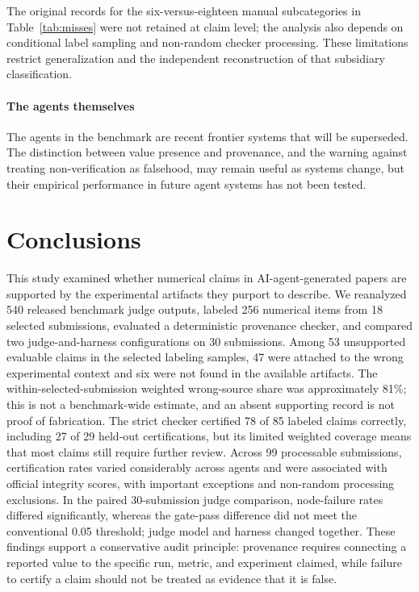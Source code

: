 \documentclass[preprint,12pt,authoryear]{elsarticle}
\begin{document}
The original records for the six-versus-eighteen manual subcategories in Table~\ref{tab:misses} were not retained at claim level; the analysis also depends on conditional label sampling and non-random checker processing. These limitations restrict generalization and the independent reconstruction of that subsidiary classification.

\paragraph{The agents themselves} The agents in the benchmark are recent frontier systems that will be superseded. The distinction between value presence and provenance, and the warning against treating non-verification as falsehood, may remain useful as systems change, but their empirical performance in future agent systems has not been tested.

\section{Conclusions}\label{sec:conclusion}

This study examined whether numerical claims in AI-agent-generated papers are supported by the experimental artifacts they purport to describe. We reanalyzed 540 released benchmark judge outputs, labeled 256 numerical items from 18 selected submissions, evaluated a deterministic provenance checker, and compared two judge-and-harness configurations on 30 submissions. Among 53 unsupported evaluable claims in the selected labeling samples, 47 were attached to the wrong experimental context and six were not found in the available artifacts. The within-selected-submission weighted wrong-source share was approximately 81\%; this is not a benchmark-wide estimate, and an absent supporting record is not proof of fabrication. The strict checker certified 78 of 85 labeled claims correctly, including 27 of 29 held-out certifications, but its limited weighted coverage means that most claims still require further review. Across 99 processable submissions, certification rates varied considerably across agents and were associated with official integrity scores, with important exceptions and non-random processing exclusions. In the paired 30-submission judge comparison, node-failure rates differed significantly, whereas the gate-pass difference did not meet the conventional 0.05 threshold; judge model and harness changed together. These findings support a conservative audit principle: provenance requires connecting a reported value to the specific run, metric, and experiment claimed, while failure to certify a claim should not be treated as evidence that it is false.
\end{document}
